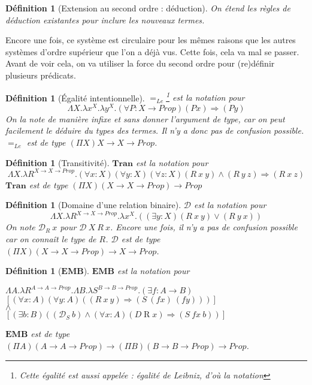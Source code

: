 \documentclass[a4paper,12pt]{article}
\theoremstyle{plain}
\newtheorem{defi}[theo]{Définition}
\begin{document}
\begin{defi}[Extension au second ordre : déduction]
On étend les règles de déduction existantes pour inclure les nouveaux termes.
\end{defi}

Encore une fois, ce système est circulaire pour les mêmes raisons que les autres systèmes d'ordre supérieur que l'on a déjà vus. Cette fois, cela va mal se passer. Avant de voir cela, on va utiliser la force du second ordre pour (re)définir plusieurs prédicats.

\begin{defi}[Égalité intentionnelle]
$=_{\mathit{Le}}$\footnote{Cette égalité est aussi appelée : égalité de Leibniz, d'où la notation} est la notation pour 
$$\Lambda X. \lambda x^X. \lambda y^X. (\forall P : X \to \mathit{Prop}) (Px) \Rightarrow(Py)$$
On la note de manière infixe et sans donner l'argument de type, car on peut facilement le déduire du types des termes. Il n'y a donc pas de confusion possible. $=_{\mathit{Le}}$ est de type $(\Pi X) X \to X \to \mathit{Prop}$.
\end{defi}

\begin{defi}[Transitivité]
$\mathbf{Tran}$ est la notation pour
$$\Lambda X. \lambda R^{X \to X \to \mathit{Prop}}.  (\forall x: X)(\forall y: X)(\forall z: X) (R \ x \ y) \land (R \ y \ z) \Rightarrow(R \ x \ z)$$
$\mathbf{Tran}$ est de type $(\Pi X)( X \to X \to \mathit{Prop}) \to \mathit{Prop}$
\end{defi}

\begin{defi}[Domaine d'une relation binaire]
$\mathcal{D}$ est la notation pour
$$\Lambda X. \lambda R^{X \to X \to \mathit{Prop}}. \lambda x^X.(( \exists y:X) (R \ x \ y) \lor (R \ y \ x))$$
On note $\mathcal{D}_R \ x$ pour $\mathcal{D}\ X \ R \ x$. Encore une fois, il n'y a pas de confusion possible car on connaît le type de $R$. $\mathcal{D}$ est de type $(\Pi X)(X \to X \to \mathit{Prop}) \to X \to \mathit{Prop}$.
\end{defi}

\begin{defi}[$\mathbf{EMB}$]
$\mathbf{EMB}$ est la notation pour\\
\begin{center}
$\Lambda A. \lambda R^{A \to A \to \mathit{Prop}}. \Lambda B. \lambda S^{B \to B \to \mathit{Prop}}.(\exists f : A \to B)$ \\[3mm]
$[(\forall x:A) (\forall y :A) ( (R \ x \ y) \Rightarrow( S \ (f x) \ (fy) ))]$\\[3mm]
$\land$ \\[3mm]
$[(\exists b : B)( (\mathcal{D}_S \ b) \land (\forall x:A) (D \mathbin{R} x) \Rightarrow(S \ fx \ b))]$
\end{center}
\vspace{4mm}
$\mathbf{EMB}$ est de type $(\Pi A)(A \to A \to \mathit{Prop}) \to (\Pi B)( B \to B \to \mathit{Prop}) \to \mathit{Prop}$.
\end{defi}
\end{document}
